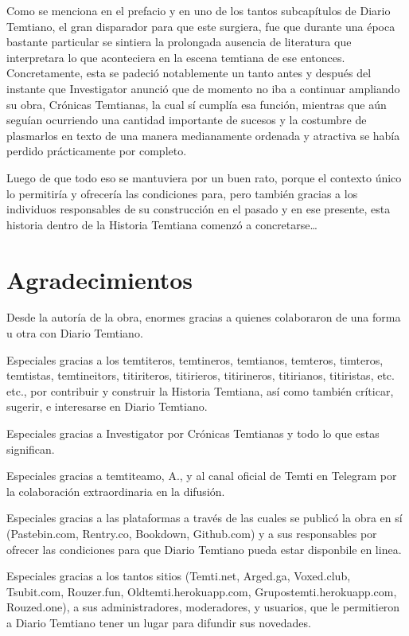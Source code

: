 \documentclass[
  spanish,
]{book}
\begin{document}
Como se menciona en el prefacio y en uno de los tantos subcapítulos de Diario Temtiano, el gran disparador para que este surgiera, fue que durante una época bastante particular se sintiera la prolongada ausencia de literatura que interpretara lo que aconteciera en la escena temtiana de ese entonces. Concretamente, esta se padeció notablemente un tanto antes y después del instante que Investigator anunció que de momento no iba a continuar ampliando su obra, Crónicas Temtianas, la cual sí cumplía esa función, mientras que aún seguían ocurriendo una cantidad importante de sucesos y la costumbre de plasmarlos en texto de una manera medianamente ordenada y atractiva se había perdido prácticamente por completo.

Luego de que todo eso se mantuviera por un buen rato, porque el contexto único lo permitiría y ofrecería las condiciones para, pero también gracias a los individuos responsables de su construcción en el pasado y en ese presente, esta historia dentro de la Historia Temtiana comenzó a concretarse\ldots{}

\hypertarget{agradecimientos}{%
\section*{Agradecimientos}\label{agradecimientos}}

Desde la autoría de la obra, enormes gracias a quienes colaboraron de una forma u otra con Diario Temtiano.

Especiales gracias a los temtiteros, temtineros, temtianos, temteros, timteros, temtistas, temtineitors, titiriteros, titirieros, titirineros, titirianos, titiristas, etc. etc., por contribuir y construir la Historia Temtiana, así como también críticar, sugerir, e interesarse en Diario Temtiano.

Especiales gracias a Investigator por Crónicas Temtianas y todo lo que estas significan.

Especiales gracias a temtiteamo, A., y al canal oficial de Temti en Telegram por la colaboración extraordinaria en la difusión.

Especiales gracias a las plataformas a través de las cuales se publicó la obra en sí (Pastebin.com, Rentry.co, Bookdown, Github.com) y a sus responsables por ofrecer las condiciones para que Diario Temtiano pueda estar disponbile en linea.

Especiales gracias a los tantos sitios (Temti.net, Arged.ga, Voxed.club, Tsubit.com, Rouzer.fun, Oldtemti.herokuapp.com, Grupostemti.herokuapp.com, Rouzed.one), a sus administradores, moderadores, y usuarios, que le permitieron a Diario Temtiano tener un lugar para difundir sus novedades.
\end{document}
